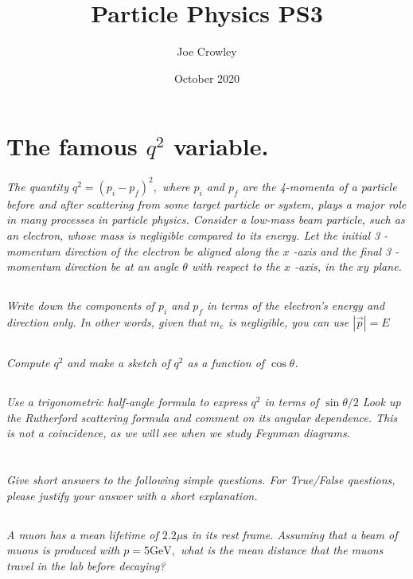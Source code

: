 \documentclass{article}
\title{Particle Physics PS3}
\author{Joe Crowley}
\date{October 2020}
\begin{document}
  



\section{The famous $q^{2}$ variable.}
\textit{The quantity $q^{2}=\left(p_{i}-p_{f}\right)^{2},$ where $p_{i}$ and $p_{f}$ are the 4-momenta of a particle before and after scattering from some target particle or system, plays a major role in many processes in particle physics. Consider a low-mass beam particle, such as an electron, whose mass is negligible compared to its energy. Let the initial 3 -momentum direction of the electron be aligned along the $x$ -axis and the final 3 -momentum direction be at an angle $\theta$ with respect to the $x$ -axis, in the $x y$ plane.}

\subsection{}
\textit{Write down the components of $p_{i}$ and $p_{f}$ in terms of the electron's energy and direction only. In other words, given that $m_{e}$ is negligible, you can use $|\vec{p}|=E$}
\subsection{}
\textit{Compute $q^{2}$ and make a sketch of $q^{2}$ as a function of $\cos \theta$.}


\subsection{}
\textit{Use a trigonometric half-angle formula to express $q^{2}$ in terms of $\sin \theta / 2$ Look up the Rutherford scattering formula and comment on its angular dependence. This is not a coincidence, as we will see when we study Feynman diagrams.}


\newpage


\section{}
\textit{Give short answers to the following simple questions. For True/False questions, please justify your answer with a short explanation.}



\subsection{}
\textit{ A muon has a mean lifetime of $2.2 \mu \mathrm{s}$ in its rest frame. Assuming that a beam of muons is produced with $p=5 \mathrm{GeV},$ what is the mean distance that the muons travel in the lab before decaying?}
\end{document}
